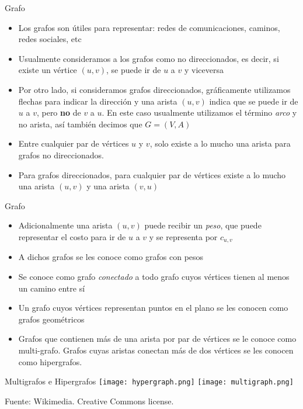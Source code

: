 \documentclass[]{beamer}
\begin{document}
\begin{frame}{Grafo}
  \begin{itemize}
    \item Los grafos son \'utiles para representar: redes de comunicaciones, caminos, redes sociales, etc
      \pause
    \item Usualmente consideramos a los grafos como no direccionados, es decir, si existe un v\'ertice $(u,v)$, se puede ir de $u$ a $v$ y viceversa
      \pause
    \item Por otro lado, si consideramos grafos direccionados, gr\'aficamente utilizamos flechas para indicar la direcci\'on y una arista $(u,v)$ indica que se puede ir de $u$ a $v$, pero \textbf{no} de $v$ a $u$. En este caso usualmente utilizamos el t\'ermino \textit{arco} y no arista, as\'i tambi\'en decimos que $G = (V,A)$
      \pause
    \item Entre cualquier par de v\'ertices $u$ y $v$, solo existe a lo mucho una arista para grafos no direccionados. 
      \pause
    \item Para grafos direccionados, para cualquier par de v\'ertices existe a lo mucho una arista $(u,v)$ y una arista $(v,u)$
  \end{itemize}
\end{frame}

\begin{frame}{Grafo}
  \begin{itemize}
    \item Adicionalmente una arista $(u,v)$ puede recibir un \textit{peso}, que puede representar el costo para ir de $u$ a $v$ y se representa por $c_{u,v}$
      \pause
    \item A dichos grafos se les conoce como grafos con pesos
      \pause
    \item Se conoce como grafo \textit{conectado} a todo grafo cuyos v\'ertices tienen al menos un camino entre s\'i
      \pause
    \item Un grafo cuyos v\'ertices representan puntos en el plano se les conocen como grafos geom\'etricos
      \pause
    \item Grafos que contienen m\'as de una arista por par de v\'ertices se le conoce como multi-grafo. Grafos cuyas aristas conectan m\'as de dos v\'ertices se les conocen como hipergrafos.
  \end{itemize}
\end{frame}

\begin{frame}{Multigrafos e Hipergrafos}
  \texttt{[image: hypergraph.png]}
  \texttt{[image: multigraph.png]}

  Fuente: Wikimedia. Creative Commons license.
\end{frame}
\end{document}
